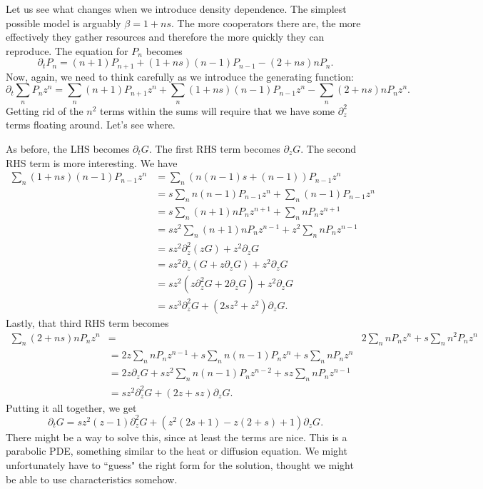 \documentclass[10pt]{revtex4}
\begin{document}
Let us see what changes when we introduce density dependence.
The simplest possible model is arguably $\beta = 1+ns$.
The more cooperators there are, the more effectively they gather resources and therefore the more quickly they can reproduce.
The equation for $P_n$ becomes
\begin{equation}
\partial_t P_n = (n+1)P_{n+1} + (1+ns)(n-1)P_{n-1} - (2+ns) nP_n.
\end{equation}
Now, again, we need to think carefully as we introduce the generating function:
\begin{equation}
\partial_t \sum_n P_n z^n = \sum_n (n+1)P_{n+1}z^n + \sum_n (1+ns)(n-1)P_{n-1}z^n - \sum_n (2+ns) nP_n z^n.
\end{equation}
Getting rid of the $n^2$ terms within the sums will require that we have some $\partial_z^2$ terms floating around.
Let's see where.

As before, the LHS becomes $\partial_t G$.
The first RHS term becomes $\partial_z G$.
The second RHS term is more interesting. We have
\begin{align}
\sum_n (1+ns)(n-1)P_{n-1}z^n &= \sum_n (n(n-1)s + (n-1))P_{n-1}z^n \nonumber \\
&= s\sum_n n(n-1)P_{n-1}z^n + \sum_n (n-1)P_{n-1}z^n \nonumber \\
&= s\sum_n (n+1)nP_n z^{n+1} + \sum_n n P_n z^{n+1} \nonumber \\
&= sz^2\sum_n (n+1)nP_n z^{n-1} + z^2 \sum_n n P_n z^{n-1} \nonumber \\
&= sz^2\partial_z^2 (zG) + z^2 \partial_z G \nonumber \\
&= sz^2 \partial_z (G + z\partial_z G) + z^2 \partial_z G \nonumber \\
&= sz^2 (z\partial_z^2 G + 2\partial_z G) + z^2\partial_z G \nonumber \\
&= sz^3 \partial_z^2 G + (2sz^2 + z^2)\partial_z G.
\end{align}
Lastly, that third RHS term becomes
\begin{align}
\sum_n (2+ns) nP_n z^n &=& 2\sum_n nP_n z^n + s\sum_n n^2 P_n z^n \nonumber \\
&= 2z \sum_n nP_n z^{n-1} + s\sum_n n(n-1) P_n z^n + s\sum_n nP_n z^n \nonumber \\
&= 2z \partial_z G + sz^2\sum_n n(n-1) P_n z^{n-2} + sz\sum_n nP_n z^{n-1} \nonumber \\
&= sz^2 \partial_z^2 G + (2z+sz)\partial_z G.
\end{align}
Putting it all together, we get
\begin{equation}
\partial_t G = sz^2(z-1) \partial_z^2 G + (z^2(2s+1) - z(2+s) + 1)\partial_z G.
\end{equation}
There might be a way to solve this, since at least the terms are nice.
This is a parabolic PDE, something similar to the heat or diffusion equation.
We might unfortunately have to ``guess" the right form for the solution, thought we might be able to use characteristics somehow.
\end{document}
